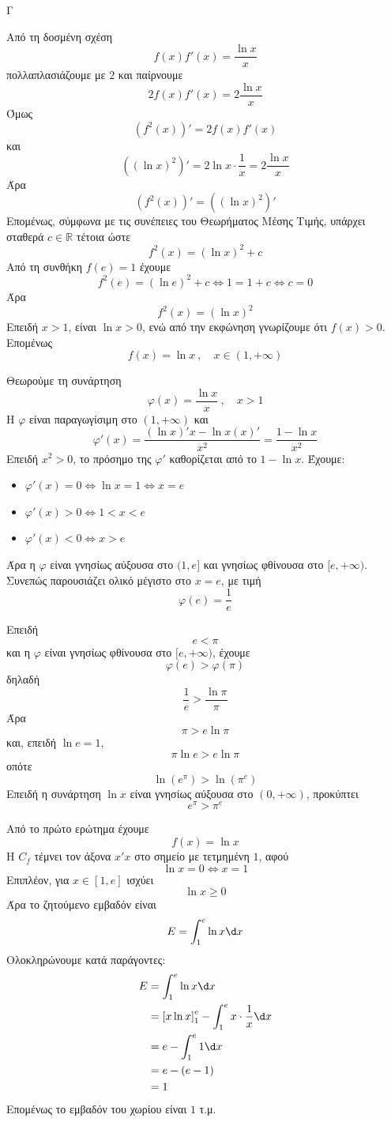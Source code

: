 \begin{thema}{Γ}
\begin{erwthma}
\item Από τη δοσμένη σχέση
\[
f(x)f'(x)=\frac{\ln x}{x}
\]
πολλαπλασιάζουμε με $2$ και παίρνουμε
\[
2f(x)f'(x)=2\frac{\ln x}{x}
\]
Όμως
\[
\left(f^2(x)\right)'=2f(x)f'(x)
\]
και
\[
\left((\ln x)^2\right)'=2\ln x\cdot\frac{1}{x}=2\frac{\ln x}{x}
\]
Άρα
\[
\left(f^2(x)\right)'=\left((\ln x)^2\right)'
\]
Επομένως, σύμφωνα με τις συνέπειες του Θεωρήματος Μέσης Τιμής, υπάρχει σταθερά $c\in\mathbb{R}$ τέτοια ώστε
\[
f^2(x)=(\ln x)^2+c
\]
Από τη συνθήκη $f(e)=1$ έχουμε
\[
f^2(e)=(\ln e)^2+c\Leftrightarrow 1=1+c\Leftrightarrow c=0
\]
Άρα
\[
f^2(x)=(\ln x)^2
\]
Επειδή $x>1$, είναι $\ln x>0$, ενώ από την εκφώνηση γνωρίζουμε ότι $f(x)>0$.
Επομένως
\[
f(x)=\ln x\ ,\quad x\in(1,+\infty)
\]

\item Θεωρούμε τη συνάρτηση
\[
\varphi(x)=\frac{\ln x}{x}\ ,\quad x>1
\]
Η $\varphi$ είναι παραγωγίσιμη στο $(1,+\infty)$ και
\[
\varphi'(x)=\frac{(\ln x)'x-\ln x(x)'}{x^2}
=\frac{1-\ln x}{x^2}
\]
Επειδή $x^2>0$, το πρόσημο της $\varphi'$ καθορίζεται από το $1-\ln x$.
Έχουμε:
\begin{itemize}
\item $\varphi'(x)=0\Leftrightarrow \ln x=1\Leftrightarrow x=e$
\item $\varphi'(x)>0\Leftrightarrow 1<x<e$
\item $\varphi'(x)<0\Leftrightarrow x>e$
\end{itemize}
Άρα η $\varphi$ είναι γνησίως αύξουσα στο $(1,e]$ και γνησίως φθίνουσα στο $[e,+\infty)$.
Συνεπώς παρουσιάζει ολικό μέγιστο στο $x=e$, με τιμή
\[
\varphi(e)=\frac{1}{e}
\]

\item Επειδή
\[
e<\pi
\]
και η $\varphi$ είναι γνησίως φθίνουσα στο $[e,+\infty)$, έχουμε
\[
\varphi(e)>\varphi(\pi)
\]
δηλαδή
\[
\frac{1}{e}>\frac{\ln\pi}{\pi}
\]
Άρα
\[
\pi>e\ln\pi
\]
και, επειδή $\ln e=1$,
\[
\pi\ln e>e\ln\pi
\]
οπότε
\[
\ln(e^\pi)>\ln(\pi^e)
\]
Επειδή η συνάρτηση $\ln x$ είναι γνησίως αύξουσα στο $(0,+\infty)$, προκύπτει
\[
e^\pi>\pi^e
\]

\item Από το πρώτο ερώτημα έχουμε
\[
f(x)=\ln x
\]
Η $C_f$ τέμνει τον άξονα $x'x$ στο σημείο με τετμημένη $1$, αφού
\[
\ln x=0\Leftrightarrow x=1
\]
Επιπλέον, για $x\in[1,e]$ ισχύει
\[
\ln x\geq 0
\]
Άρα το ζητούμενο εμβαδόν είναι
\[
E=\dint_1^e \ln x\d x
\]
Ολοκληρώνουμε κατά παράγοντες:
\begin{align*}
E
&=\dint_1^e \ln x\d x\\
&=\left[x\ln x\right]_1^e-\dint_1^e x\cdot\frac{1}{x}\d x\\
&=e-\dint_1^e 1\d x\\
&=e-(e-1)\\
&=1
\end{align*}
Επομένως το εμβαδόν του χωρίου είναι $1$ τ.μ.
\end{erwthma}
\end{thema}

